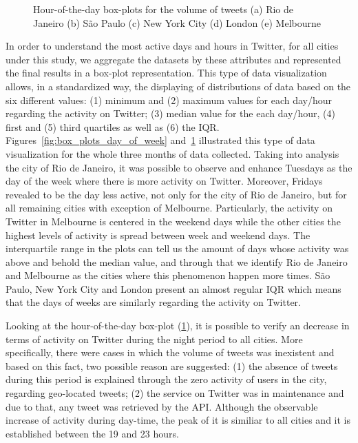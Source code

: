 \begin{figure}[!htbp]
	\caption[Hour-of-the-day box-plots for the volume of tweets]{Hour-of-the-day box-plots for the volume of tweets (a) Rio de Janeiro (b) São Paulo (c) New York City (d) London (e) Melbourne}
	\label{fig:box_plots_hour_of_day}
\end{figure}

In order to understand the most active days and hours in Twitter, for all cities under this study, we aggregate the datasets by these attributes and represented the final results in a box-plot representation. This type of data visualization allows, in a standardized way, the displaying of distributions of data based on the six different values: (1) minimum and (2) maximum values for each day/hour regarding the activity on Twitter; (3) median value for the each day/hour, (4) first and (5) third quartiles as well as (6) the \gls{IQR}. Figures~\ref{fig:box_plots_day_of_week} and~\ref{fig:box_plots_hour_of_day} illustrated this type of data visualization for the whole three months of data collected. Taking into analysis the city of Rio de Janeiro, it was possible to observe and enhance Tuesdays as the day of the week where there is more activity on Twitter. Moreover, Fridays revealed to be the day less active, not only for the city of Rio de Janeiro, but for all remaining cities with exception of Melbourne. Particularly, the activity on Twitter in Melbourne is centered in the weekend days while the other cities the highest levels of activity is spread between week and weekend days. The interquartile range in the plots can tell us the amount of days whose activity was above and behold the median value, and through that we identify Rio de Janeiro and Melbourne as the cities where this phenomenon happen more times. São Paulo, New York City and London present an almost regular \gls{IQR} which means that the days of weeks are similarly regarding the activity on Twitter.

Looking at the hour-of-the-day box-plot (\ref{fig:box_plots_hour_of_day}), it is possible to verify an decrease in terms of activity on Twitter during the night period to all cities. More specifically, there were cases in which the volume of tweets was inexistent and based on this fact, two possible reason are suggested: (1) the absence of tweets during this period is explained through the zero activity of users in the city, regarding geo-located tweets; (2) the service on Twitter was in maintenance and due to that, any tweet was retrieved by the API. Although the observable increase of activity during day-time, the peak of it is similiar to all cities and it is established between the 19 and 23 hours.

